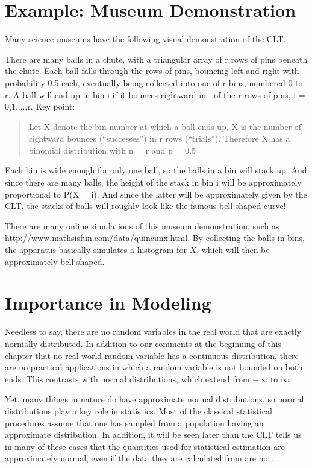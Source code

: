 \section{Example:  Museum Demonstration}

Many science museums have the following visual demonstration of the CLT.

There are many balls in a chute, with a triangular array of r rows of pins
beneath the chute.  Each ball falls through the rows of pins, bouncing
left and right with probability 0.5 each, eventually being collected
into one of r bins, numbered 0 to r.  A ball will end up in bin i if it
bounces rightward in i of the r rows of pins, i = 0,1,...,r.  Key point:

\begin{quote}
Let X denote the bin number at which a ball ends up.  X is the number of
rightward bounces (``successes'') in r rows (``trials'').  Therefore X
has a binomial distribution with n = r and p = 0.5
\end{quote}

Each bin is wide enough for only one ball, so the balls in a bin will
stack up.  And since there are many balls, the height of the stack in
bin i will be approximately proportional to P(X = i).  And since the
latter will be approximately given by the CLT, the stacks of balls will
roughly look like the famous bell-shaped curve!

There are many online simulations of this museum demonstration, such as
\url{http://www.mathsisfun.com/data/quincunx.html}.  By collecting the
balls in bins, the apparatus basically simulates a histogram for $X$,
which will then be approximately bell-shaped.

\section{Importance in Modeling}
\label{normalimp}

Needless to say, there are no random variables in the real world that
are exactly normally distributed.  In addition to our comments at the
beginning of this chapter that no real-world random variable has a
continuous distribution, there are no practical applications in which a
random variable is not bounded on both ends.  This contrasts with normal
distributions, which extend from $-\infty$ to $\infty$.

Yet, many things in nature do have approximate normal distributions, so
normal distributions play a key role in statistics.  Most of the
classical statistical procedures assume that one has sampled from a
population having an approximate distribution.  In addition, it will be
seen later than the CLT tells us in many of these cases that the
quantities used for statistical estimation are approximately normal,
even if the data they are calculated from are not.

